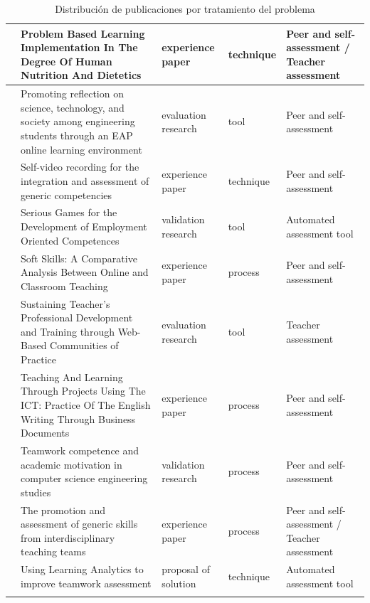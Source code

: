 \begin{landscape}
\begin{center}
\begin{longtable}{| c | m{9cm} | m{4cm} | m{2.5cm} | m{3.5cm} |}
    \hline
    \cite{lasa2013problem} & Problem Based Learning Implementation In The Degree Of Human Nutrition And Dietetics & experience paper & technique & Peer and self-assessment / Teacher assessment \\
    \hline
    \cite{arno2011promoting} & Promoting reflection on science, technology, and society among engineering students through an EAP online learning environment & evaluation research & tool & Peer and self-assessment \\
    \hline
    \cite{masip2013self} & Self-video recording for the integration and assessment of generic competencies & experience paper & technique & Peer and self-assessment \\
    \hline
    \cite{guenaga2013serious} & Serious Games for the Development of Employment Oriented Competences & validation research & tool & Automated assessment tool \\
    \hline
    \cite{ruizacarate2013soft} & Soft Skills: A Comparative Analysis Between Online and Classroom Teaching & experience paper & process & Peer and self-assessment \\
    \hline
    \cite{starcic2008sustaining} & Sustaining Teacher's Professional Development and Training through Web-Based Communities of Practice & evaluation research & tool & Teacher assessment \\
    \hline
    \cite{renau2010teaching} & Teaching And Learning Through Projects Using The ICT: Practice Of The English Writing Through Business Documents & experience paper & process & Peer and self-assessment \\
    \hline
    \cite{martinez2014teamwork} & Teamwork competence and academic motivation in computer science engineering studies & validation research & process & Peer and self-assessment \\
    \hline
    \cite{carreras2013promotion} & The promotion and assessment of generic skills from interdisciplinary teaching teams & experience paper & process & Peer and self-assessment / Teacher assessment \\
    \hline
    \cite{fidalgo:2015} & Using Learning Analytics to improve teamwork assessment & proposal of solution & technique & Automated assessment tool \\
    \hline
\caption{Distribución de publicaciones por tratamiento del problema}
\label{tab:ListadoTrabajos}
\end{longtable}
\end{center}
\end{landscape}

